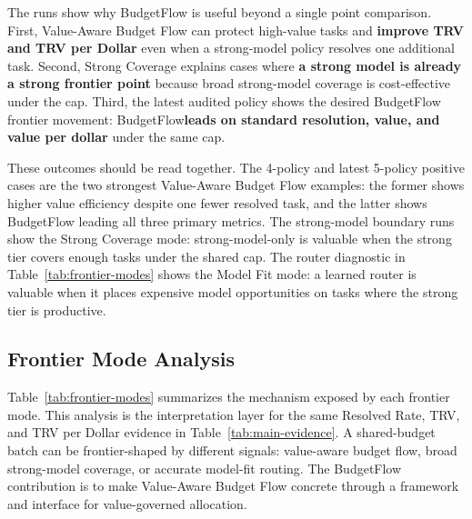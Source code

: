 \documentclass{article}
\newcommand{\method}{BudgetFlow\xspace}
\newcommand{\trv}{TRV\xspace}
\begin{document}
The runs show why \method is useful beyond a single point comparison. First, Value-Aware Budget Flow can protect high-value tasks and \textbf{improve \trv and \trv per Dollar} even when a strong-model policy resolves one additional task. Second, Strong Coverage explains cases where \textbf{a strong model is already a strong frontier point} because broad strong-model coverage is cost-effective under the cap. Third, the latest audited policy shows the desired \method frontier movement: \method \textbf{leads on standard resolution, value, and value per dollar} under the same cap.

These outcomes should be read together. The 4-policy and latest 5-policy positive cases are the two strongest Value-Aware Budget Flow examples: the former shows higher value efficiency despite one fewer resolved task, and the latter shows \method leading all three primary metrics. The strong-model boundary runs show the Strong Coverage mode: strong-model-only is valuable when the strong tier covers enough tasks under the shared cap. The router diagnostic in Table~\ref{tab:frontier-modes} shows the Model Fit mode: a learned router is valuable when it places expensive model opportunities on tasks where the strong tier is productive.

\subsection{Frontier Mode Analysis}
Table~\ref{tab:frontier-modes} summarizes the mechanism exposed by each frontier mode. This analysis is the interpretation layer for the same Resolved Rate, \trv, and \trv per Dollar evidence in Table~\ref{tab:main-evidence}. A shared-budget batch can be frontier-shaped by different signals: value-aware budget flow, broad strong-model coverage, or accurate model-fit routing. The \method contribution is to make Value-Aware Budget Flow concrete through a framework and interface for value-governed allocation.
\end{document}

